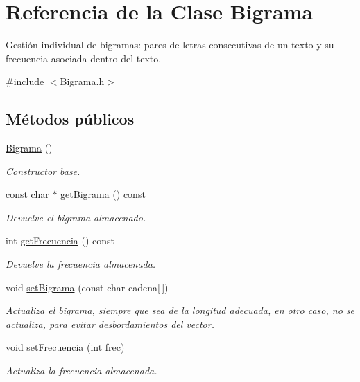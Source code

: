 \hypertarget{classBigrama}{}\section{Referencia de la Clase Bigrama}
\label{classBigrama}


Gestión individual de bigramas\+: pares de letras consecutivas de un texto y su frecuencia asociada dentro del texto.  




{\ttfamily \#include $<$Bigrama.\+h$>$}

\subsection*{Métodos públicos}
\begin{DoxyCompactItemize}
\item 
\mbox{\label{classBigrama_ab23e397dac61913482c119af30fe37a2}} 
\hyperlink{classBigrama_ab23e397dac61913482c119af30fe37a2}{Bigrama} ()
\begin{DoxyCompactList}\small\item\em Constructor base. \end{DoxyCompactList}\item 
const char $\ast$ \hyperlink{classBigrama_adb616b62beeaa4fb9303cd647ea3fba3}{get\+Bigrama} () const
\begin{DoxyCompactList}\small\item\em Devuelve el bigrama almacenado. \end{DoxyCompactList}\item 
int \hyperlink{classBigrama_a5a7f1ec845ac5971c8d788c12171a9c9}{get\+Frecuencia} () const
\begin{DoxyCompactList}\small\item\em Devuelve la frecuencia almacenada. \end{DoxyCompactList}\item 
void \hyperlink{classBigrama_ad9f512b7f00068f100f2fdfb5de32746}{set\+Bigrama} (const char cadena\mbox{[}$\,$\mbox{]})
\begin{DoxyCompactList}\small\item\em Actualiza el bigrama, siempre que sea de la longitud adecuada, en otro caso, no se actualiza, para evitar desbordamientos del vector. \end{DoxyCompactList}\item 
void \hyperlink{classBigrama_a63dd808514f1eaf233f49cbbe3c2af82}{set\+Frecuencia} (int frec)
\begin{DoxyCompactList}\small\item\em Actualiza la frecuencia almacenada. \end{DoxyCompactList}\end{DoxyCompactItemize}


